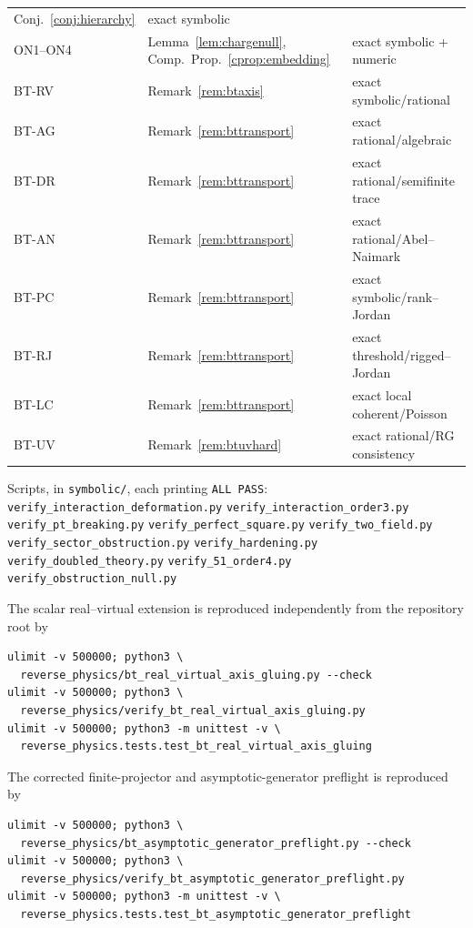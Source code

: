 \documentclass[11pt]{article}
\theoremstyle{definition}
\theoremstyle{remark}
\begin{document}
\begin{center}
\begin{tabular}{l l l}
Conj.~\ref{conj:hierarchy} & exact symbolic\\
ON1--ON4 & Lemma~\ref{lem:chargenull},
Comp.\ Prop.~\ref{cprop:embedding} & exact symbolic + numeric\\
BT-RV & Remark~\ref{rem:btaxis} & exact symbolic/rational\\
BT-AG & Remark~\ref{rem:bttransport} & exact rational/algebraic\\
BT-DR & Remark~\ref{rem:bttransport} & exact rational/semifinite trace\\
BT-AN & Remark~\ref{rem:bttransport} & exact rational/Abel--Naimark\\
BT-PC & Remark~\ref{rem:bttransport} & exact symbolic/rank--Jordan\\
BT-RJ & Remark~\ref{rem:bttransport} & exact threshold/rigged--Jordan\\
BT-LC & Remark~\ref{rem:bttransport} & exact local coherent/Poisson\\
BT-UV & Remark~\ref{rem:btuvhard} & exact rational/RG consistency\\
\hline
\end{tabular}
\end{center}

Scripts, in \texttt{symbolic/}, each printing \texttt{ALL PASS}:\\
\texttt{verify\_interaction\_deformation.py} \quad
\texttt{verify\_interaction\_order3.py}\\
\texttt{verify\_pt\_breaking.py} \quad
\texttt{verify\_perfect\_square.py} \quad
\texttt{verify\_two\_field.py}\\
\texttt{verify\_sector\_obstruction.py} \quad
\texttt{verify\_hardening.py}\\
\texttt{verify\_doubled\_theory.py} \quad
\texttt{verify\_51\_order4.py}\\
\texttt{verify\_obstruction\_null.py}

The scalar real--virtual extension is reproduced independently from the
repository root by
\begin{verbatim}
ulimit -v 500000; python3 \
  reverse_physics/bt_real_virtual_axis_gluing.py --check
ulimit -v 500000; python3 \
  reverse_physics/verify_bt_real_virtual_axis_gluing.py
ulimit -v 500000; python3 -m unittest -v \
  reverse_physics.tests.test_bt_real_virtual_axis_gluing
\end{verbatim}

The corrected finite-projector and asymptotic-generator preflight is
reproduced by
\begin{verbatim}
ulimit -v 500000; python3 \
  reverse_physics/bt_asymptotic_generator_preflight.py --check
ulimit -v 500000; python3 \
  reverse_physics/verify_bt_asymptotic_generator_preflight.py
ulimit -v 500000; python3 -m unittest -v \
  reverse_physics.tests.test_bt_asymptotic_generator_preflight
\end{verbatim}
\end{document}
